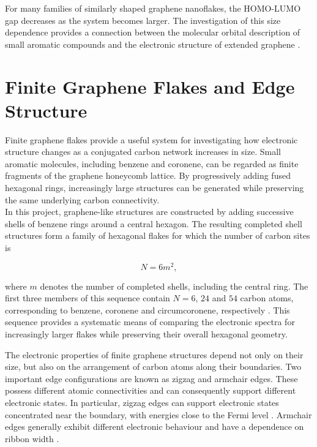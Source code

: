 \noindent For many families of similarly shaped graphene nanoflakes, the HOMO-LUMO gap decreases as the system becomes larger. The investigation of this size dependence provides a connection between the molecular orbital description of small aromatic compounds and the electronic structure of extended graphene \parencite{jeongCalculationElectronicStructures2024}.


\section{Finite Graphene Flakes and Edge Structure}
\label{sec:finite_graphene_flakes}

Finite graphene flakes provide a useful system for investigating how electronic structure changes as a conjugated carbon network increases in size. Small aromatic molecules, including benzene and coronene, can be regarded as finite fragments of the graphene honeycomb lattice. By progressively adding fused hexagonal rings, increasingly large structures can be generated while preserving the same underlying carbon connectivity. \\

\noindent In this project, graphene-like structures are constructed by adding successive shells of benzene rings around a central hexagon. The resulting completed shell structures form a family of hexagonal flakes for which the number of carbon sites is

\begin{equation}
    N = 6m^2,
    \label{eq:completed_shell_sites}
\end{equation}

\noindent where $m$ denotes the number of completed shells, including the central ring. The first three members of this sequence contain $N=6$, $24$ and $54$ carbon atoms, corresponding to benzene, coronene and circumcoronene, respectively \parencite{jeongCalculationElectronicStructures2024, zou_circumcoronenes_2023}. This sequence provides a systematic means of comparing the electronic spectra for increasingly larger flakes while preserving their overall hexagonal geometry. 

\noindent The electronic properties of finite graphene structures depend not only on their size, but also on the arrangement of carbon atoms along their boundaries. Two important edge configurations are known as zigzag and armchair edges. These possess different atomic connectivities and can consequently support different electronic states. In particular, zigzag edges can support electronic states concentrated near the boundary, with energies close to the Fermi level \parencite{nakada_edge_1996}. Armchair edges generally exhibit different electronic behaviour and have a dependence on ribbon width \parencite{son_energy_2006}. \\

